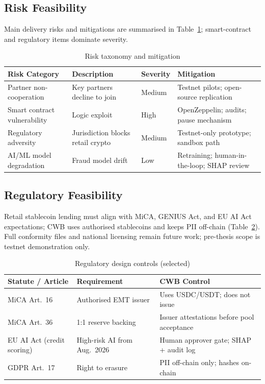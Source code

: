 \documentclass[12pt, a4paper]{report}
\newcommand{\tableheadcolor}{\rowcolor{TableHeadBg}}
\begin{document}
\vspace{2pt}

\subsection{Risk Feasibility}

Main delivery risks and mitigations are summarised in Table~\ref{tab:risk-taxonomy}; smart-contract and regulatory items dominate severity.

\begin{table}[H]
\centering
\caption[Risk taxonomy and mitigation]{Risk taxonomy and mitigation}
\label{tab:risk-taxonomy}
\begin{tabular}{p{3cm}p{4cm}p{1.5cm}p{5cm}}
\toprule
\tableheadcolor
\textbf{Risk Category} & \textbf{Description} & \textbf{Severity} & \textbf{Mitigation} \\
\midrule
Partner non-cooperation & Key partners decline to join & Medium & Testnet pilots; open-source replication \\
Smart contract vulnerability & Logic exploit & High & OpenZeppelin; audits; pause mechanism \\
Regulatory adversity & Jurisdiction blocks retail crypto & Medium & Testnet-only prototype; sandbox path \\
AI/ML model degradation & Fraud model drift & Low & Retraining; human-in-the-loop; SHAP review \\
\bottomrule
\end{tabular}
\end{table}

\vspace{2pt}

\subsection{Regulatory Feasibility}
\label{sec:mica-compliance}

Retail stablecoin lending must align with MiCA, GENIUS Act, and EU AI Act expectations; CWB uses authorised stablecoins and keeps PII off-chain (Table~\ref{tab:mica-mapping}). Full conformity files and national licensing remain future work; pre-thesis scope is testnet demonstration only.

\begin{table}[H]
\centering
\caption[Regulatory design controls (selected)]{Regulatory design controls (selected)}
\label{tab:mica-mapping}
\begin{tabular}{p{3.2cm}p{4.6cm}p{5.8cm}}
\toprule
\tableheadcolor
\textbf{Statute / Article} & \textbf{Requirement} & \textbf{CWB Control} \\
\midrule
MiCA Art.~16 & Authorised EMT issuer & Uses USDC/USDT; does not issue \\
MiCA Art.~36 & 1{:}1 reserve backing & Issuer attestations before pool acceptance \\
EU AI Act (credit scoring) & High-risk AI from Aug.~2026~ & Human approver gate; SHAP + audit log \\
GDPR Art.~17 & Right to erasure & PII off-chain only; hashes on-chain \\
\bottomrule
\end{tabular}
\end{table}
\end{document}
